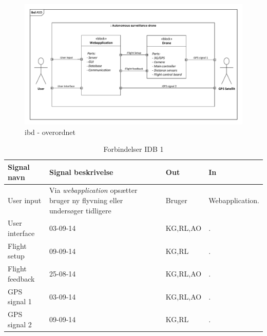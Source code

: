 

\begin{figure}[H]
\centering
\includegraphics[width=1\textwidth]{Billeder/IBD/ibd1_overordnet.pdf}
\caption{ibd - overordnet}
\label{fig:ibd_overordnet}
\end{figure}

\begin{table}[H]
	\centering
		\begin{tabular}{|p{2.5 cm}|p{5.5 cm}|p{2.5 cm}|p{2.5 cm}|} 
		\hline
			\textbf{Signal navn} 	& \textbf{Signal beskrivelse}		& \textbf{Out} 				& \textbf{In}     \\ \hline
			User input 			& Via \textit{webapplication} opsætter bruger ny flyvning eller undersøger tidligere & Bruger 		& Webapplication.			    \\ \hline
			User interface 		& 03-09-14	& KG,RL,AO				& .				\\ \hline
			Flight setup		& 09-09-14	& KG,RL					& .	\\ \hline
			Flight feedback		& 25-08-14	& KG,RL,AO				& .			    \\ \hline
			GPS signal 1		& 03-09-14	& KG,RL,AO				& .				\\ \hline
			GPS signal 2		& 09-09-14	& KG,RL					& .	\\ \hline  
		\end{tabular}
	\caption{Forbindelser IDB 1}
	\label{tab:IDB1}
\end{table}

